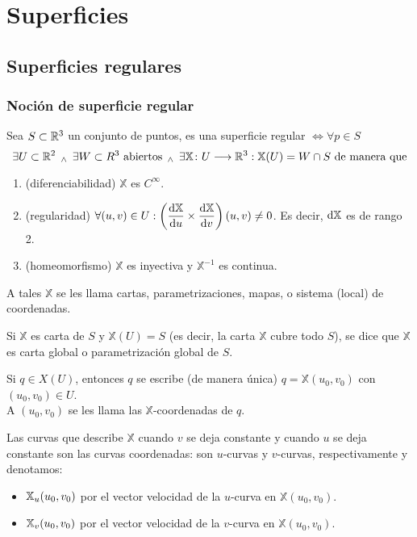 \section{Superficies}
\subsection{Superficies regulares}
\subsubsection{Noción de superficie regular}

\begin{defn}
	Sea $S \subset \mathbb{R}^3$ un conjunto de puntos, es una superficie regular $\iff \forall p \in S$
	\[\exists U \subset \mathbb{R}^2 \, \; _{\wedge} \; \, \exists W \subset R^3 \text{ abiertos} \, \; _{\wedge} \; \, \exists \mathbb{X} \colon U \longrightarrow \mathbb{R}^3 : \mathbb{X}(U) = W \cap S \text{ de manera que}\]
	\begin{enumerate}
		\item (diferenciabilidad) $\mathbb{X}$ es $C^\infty$.
		\item (regularidad) $\ds \forall (u, v) \in U : \left(\odv{\mathbb{X}}{u} \times \odv{\mathbb{X}}{v}\right)(u, v) \neq 0$. Es decir, $\odif{\mathbb{X}}$ es de rango 2.
		\item (homeomorfismo) $\mathbb{X}$ es inyectiva y $\mathbb{X}^{-1}$ es continua.
	\end{enumerate}
\end{defn}

A tales $\mathbb{X}$ se les llama cartas, parametrizaciones, mapas, o sistema (local) de coordenadas.

Si $\mathbb{X}$ es carta de $S$ y $\mathbb{X}(U) = S$ (es decir, la carta $\mathbb{X}$ cubre todo $S$), se dice que $\mathbb{X}$ es carta global o parametrización global de $S$.


Si $q \in X(U)$, entonces $q$ se escribe (de manera única) $q = \mathbb{X}(u_0, v_0)$ con $(u_0, v_0) \in U$. \\
A $(u_0, v_0)$ se les llama las $\mathbb{X}$-coordenadas de $q$.

Las curvas que describe $\mathbb{X}$ cuando $v$ se deja constante y cuando $u$ se deja constante son las curvas coordenadas: son $u$-curvas y $v$-curvas, respectivamente y denotamos:
\begin{itemize}
	\item $\mathbb{X}_u(u_0, v_0)$ por el vector velocidad de la $u$-curva en $\mathbb{X}(u_0, v_0)$.
	\item $\mathbb{X}_v(u_0, v_0)$ por el vector velocidad de la $v$-curva en $\mathbb{X}(u_0, v_0)$.
\end{itemize}

